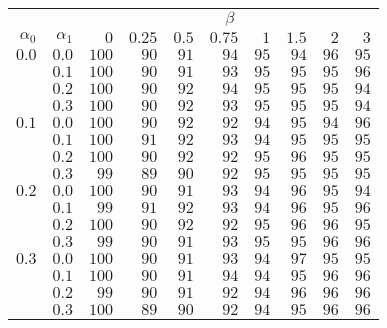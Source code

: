 \begin{tabular}{rr|rrrrrrrr}
\hline\hline
 && \multicolumn{8}{c}{$\beta$}\\
 $\alpha_0$ & $\alpha_1$ & $0$ & $0.25$ & $0.5$ & $0.75$ & $1$ & $1.5$ & $2$ & $3$ \\ 
 \hline
$0.0$ & $0.0$ & $100$ & $90$ & $91$ & $94$ & $95$ & $94$ & $96$ & $95$\\ 
 & $0.1$ & $100$ & $90$ & $91$ & $93$ & $95$ & $95$ & $95$ & $96$\\ 
 & $0.2$ & $100$ & $90$ & $92$ & $94$ & $95$ & $95$ & $95$ & $94$\\ 
 & $0.3$ & $100$ & $90$ & $92$ & $93$ & $95$ & $95$ & $95$ & $94$\\ 
\hline 
 $0.1$ & $0.0$ & $100$ & $90$ & $92$ & $92$ & $94$ & $95$ & $94$ & $96$\\ 
 & $0.1$ & $100$ & $91$ & $92$ & $93$ & $94$ & $95$ & $95$ & $95$\\ 
 & $0.2$ & $100$ & $90$ & $92$ & $92$ & $95$ & $96$ & $95$ & $95$\\ 
 & $0.3$ & $99$ & $89$ & $90$ & $92$ & $95$ & $95$ & $95$ & $95$\\ 
\hline 
 $0.2$ & $0.0$ & $100$ & $90$ & $91$ & $93$ & $94$ & $96$ & $95$ & $94$\\ 
 & $0.1$ & $99$ & $91$ & $92$ & $93$ & $94$ & $96$ & $95$ & $96$\\ 
 & $0.2$ & $100$ & $90$ & $92$ & $92$ & $95$ & $96$ & $96$ & $95$\\ 
 & $0.3$ & $99$ & $90$ & $91$ & $93$ & $95$ & $95$ & $96$ & $96$\\ 
\hline 
 $0.3$ & $0.0$ & $100$ & $90$ & $91$ & $93$ & $94$ & $97$ & $95$ & $95$\\ 
 & $0.1$ & $100$ & $90$ & $91$ & $94$ & $94$ & $95$ & $96$ & $96$\\ 
 & $0.2$ & $99$ & $90$ & $91$ & $92$ & $94$ & $96$ & $96$ & $96$\\ 
 & $0.3$ & $100$ & $89$ & $90$ & $92$ & $94$ & $95$ & $96$ & $96$\\ 
 \hline 
 \end{tabular}